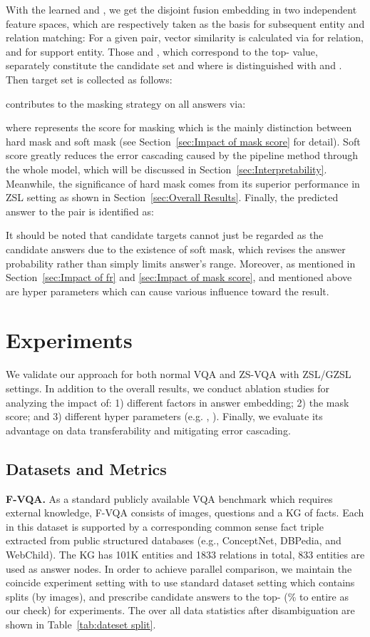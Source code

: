 \documentclass[runningheads]{llncs}
\newcommand{\cjy}[1]{{\color{black}#1}}
\begin{document}
With the learned  and , we get the disjoint fusion embedding in two independent feature spaces, which are respectively taken as the basis for subsequent entity and relation matching:  
For a given  pair, vector similarity  is calculated  via  for relation, and  for support entity. Those  and , which correspond to the top-  value, separately constitute the candidate set  and  
where  is distinguished with  and .
Then target set  is collected  as follows:


 contributes to the masking strategy on all answers  via:

where  represents the score for masking which is the mainly distinction between hard mask and soft mask (see Section~\ref{sec:Impact of mask score} for detail). Soft score greatly reduces the error cascading caused by the pipeline method through the whole model, which will be discussed in Section~\ref{sec:Interpretability}. Meanwhile, the significance of hard mask comes from its superior performance in ZSL setting as shown in Section~\ref{sec:Overall Results}.
Finally, the predicted answer  to the  pair is identified as:


It should be noted that candidate targets cannot just be regarded as the candidate answers due to the existence of soft mask, which revises the answer probability rather than simply limits answer's range. 
Moreover, as mentioned in Section~\ref{sec:Impact of fr} and \ref{sec:Impact of mask score},  and  mentioned above are hyper parameters which can cause various influence toward the result.
\section{Experiments}
We validate our approach
for both normal VQA and ZS-VQA with \cjy{ZSL/GZSL settings. 
In addition to the overall results, we conduct ablation studies for analyzing the impact of: 1) different factors in answer embedding; 2) the mask score; and 3) different \cjy{hyper parameters} (e.g. , ).}
Finally, we evaluate its advantage on data transferability and mitigating error cascading. 
\subsection{Datasets and Metrics}
\textbf{F-VQA.}
As a standard publicly available VQA benchmark which requires external knowledge, F-VQA \cite{DBLP:journals/pami/WangWSDH18} consists of  images,  questions and a KG of  facts. Each  in this dataset is supported by a corresponding common sense fact triple extracted from public structured databases (e.g., ConceptNet, DBPedia, and WebChild). The KG has 101K entities and 1833 relations in total, 833 entities are used as answer nodes. 
In order to achieve parallel comparison, we maintain the coincide experiment setting with \cite{DBLP:journals/pami/WangWSDH18,DBLP:conf/eccv/NarasimhanS18} to use standard dataset setting which contains  splits (by images), and prescribe candidate answers to the top- (\% to entire as our check) for experiments. 
The over all data statistics after disambiguation are shown in Table~\ref{tab:dateset split}.  
\end{document}
